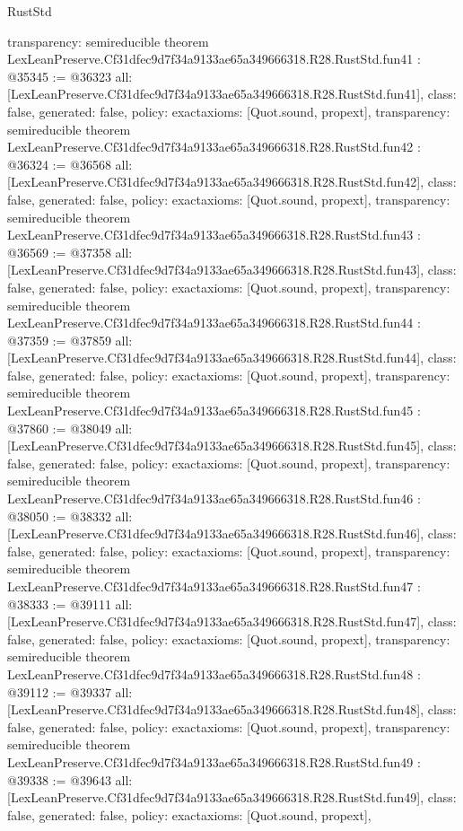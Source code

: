 \begin{lexlean}{RustStd}
\begin{coremodule}
{  transparency: semireducible
}
theorem LexLeanPreserve.Cf31dfec9d7f34a9133ae65a349666318.R28.RustStd.fun41 : @35345 := @36323 {
  all: [LexLeanPreserve.Cf31dfec9d7f34a9133ae65a349666318.R28.RustStd.fun41],
  class: false,
  generated: false,
  policy: exact{axioms: [Quot.sound, propext]},
  transparency: semireducible
}
theorem LexLeanPreserve.Cf31dfec9d7f34a9133ae65a349666318.R28.RustStd.fun42 : @36324 := @36568 {
  all: [LexLeanPreserve.Cf31dfec9d7f34a9133ae65a349666318.R28.RustStd.fun42],
  class: false,
  generated: false,
  policy: exact{axioms: [Quot.sound, propext]},
  transparency: semireducible
}
theorem LexLeanPreserve.Cf31dfec9d7f34a9133ae65a349666318.R28.RustStd.fun43 : @36569 := @37358 {
  all: [LexLeanPreserve.Cf31dfec9d7f34a9133ae65a349666318.R28.RustStd.fun43],
  class: false,
  generated: false,
  policy: exact{axioms: [Quot.sound, propext]},
  transparency: semireducible
}
theorem LexLeanPreserve.Cf31dfec9d7f34a9133ae65a349666318.R28.RustStd.fun44 : @37359 := @37859 {
  all: [LexLeanPreserve.Cf31dfec9d7f34a9133ae65a349666318.R28.RustStd.fun44],
  class: false,
  generated: false,
  policy: exact{axioms: [Quot.sound, propext]},
  transparency: semireducible
}
theorem LexLeanPreserve.Cf31dfec9d7f34a9133ae65a349666318.R28.RustStd.fun45 : @37860 := @38049 {
  all: [LexLeanPreserve.Cf31dfec9d7f34a9133ae65a349666318.R28.RustStd.fun45],
  class: false,
  generated: false,
  policy: exact{axioms: [Quot.sound, propext]},
  transparency: semireducible
}
theorem LexLeanPreserve.Cf31dfec9d7f34a9133ae65a349666318.R28.RustStd.fun46 : @38050 := @38332 {
  all: [LexLeanPreserve.Cf31dfec9d7f34a9133ae65a349666318.R28.RustStd.fun46],
  class: false,
  generated: false,
  policy: exact{axioms: [Quot.sound, propext]},
  transparency: semireducible
}
theorem LexLeanPreserve.Cf31dfec9d7f34a9133ae65a349666318.R28.RustStd.fun47 : @38333 := @39111 {
  all: [LexLeanPreserve.Cf31dfec9d7f34a9133ae65a349666318.R28.RustStd.fun47],
  class: false,
  generated: false,
  policy: exact{axioms: [Quot.sound, propext]},
  transparency: semireducible
}
theorem LexLeanPreserve.Cf31dfec9d7f34a9133ae65a349666318.R28.RustStd.fun48 : @39112 := @39337 {
  all: [LexLeanPreserve.Cf31dfec9d7f34a9133ae65a349666318.R28.RustStd.fun48],
  class: false,
  generated: false,
  policy: exact{axioms: [Quot.sound, propext]},
  transparency: semireducible
}
theorem LexLeanPreserve.Cf31dfec9d7f34a9133ae65a349666318.R28.RustStd.fun49 : @39338 := @39643 {
  all: [LexLeanPreserve.Cf31dfec9d7f34a9133ae65a349666318.R28.RustStd.fun49],
  class: false,
  generated: false,
  policy: exact{axioms: [Quot.sound, propext]},
}
\end{coremodule}
\end{lexlean}
